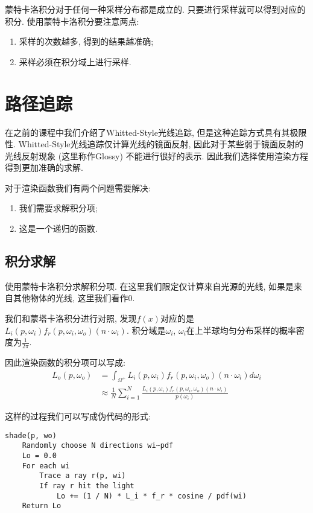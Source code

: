 蒙特卡洛积分对于任何一种采样分布都是成立的. 只要进行采样就可以得到对应的积分. 使用蒙特卡洛积分要注意两点: 
\begin{enumerate}
	\item 采样的次数越多, 得到的结果越准确; 
	\item 采样必须在积分域上进行采样. 
\end{enumerate}

\section{路径追踪}
在之前的课程中我们介绍了Whitted-Style光线追踪, 但是这种追踪方式具有其极限性. Whitted-Style光线追踪仅计算光线的镜面反射, 因此对于某些弱于镜面反射的光线反射现象 (这里称作Glossy) 不能进行很好的表示. 因此我们选择使用渲染方程得到更加准确的求解. 

对于渲染函数我们有两个问题需要解决: 
\begin{enumerate}
	\item 我们需要求解积分项; 
	\item 这是一个递归的函数. 
\end{enumerate}

\subsection{积分求解}

使用蒙特卡洛积分求解积分项. 在这里我们限定仅计算来自光源的光线, 如果是来自其他物体的光线, 这里我们看作0.

我们和蒙塔卡洛积分进行对照, 发现$f(x)$对应的是$L_i(p,\omega_i)f_r(p,\omega_i,\omega_o)(n\cdot \omega_i)$. 积分域是$\omega_i$, $\omega_i$在上半球均匀分布采样的概率密度为$\frac{1}{2\pi}$. 

因此渲染函数的积分项可以写成: 
\begin{equation}
	\begin{split}
		L_o(p,\omega_o)&=\int_{\Omega^+}L_i(p,\omega_i)f_r(p,\omega_i,\omega_o)(n\cdot \omega_i)d\omega_i\\
		&\approx \frac{1}{N}\sum_{i=1}^{N}\frac{L_i(p,\omega_i)f_r(p,\omega_i,\omega_o)(n\cdot \omega_i)}{p(\omega_i)}
	\end{split}
\end{equation}

这样的过程我们可以写成伪代码的形式: 
\begin{lstlisting}[caption=渲染函数积分项对光源光线求解伪代码]
shade(p, wo)
	Randomly choose N directions wi~pdf
	Lo = 0.0
	For each wi
		Trace a ray r(p, wi)
		If ray r hit the light
			Lo += (1 / N) * L_i * f_r * cosine / pdf(wi)
	Return Lo
\end{lstlisting}

